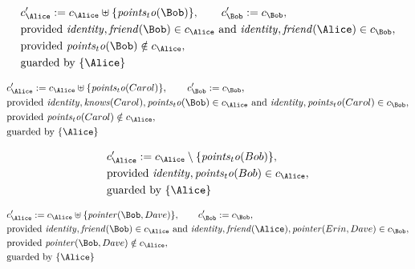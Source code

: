 \begin{align*}
&
c'_
{
\Alice
}
 := 
c_
{
\Alice
}
 \uplus 
\{
\mathit{
points_to
}
(
\Bob
)
\}
, \qquad 
c'_
{
\Bob
}
 := 
c_
{
\Bob
}
,\\
&
\text{provided } 
\mathit{
identity
}
,
\mathit{
friend
}
(
\Bob
)
 \in c_
{
\Alice
}
 \text{ and } 
\mathit{
identity
}
,
\mathit{
friend
}
(
\Alice
)
 \in c_
{
\Bob
}
,\\
&
\text{provided } 
\mathit{
points_to
}
(
\Bob
)
 \notin c_
{
\Alice
}
,\\
&
\text{guarded by } \{
\Alice
\}
\end{align*}

\begin{align*}
&
c'_
{
\Alice
}
 := 
c_
{
\Alice
}
 \uplus 
\{
\mathit{
points_to
}
(
Carol
)
\}
, \qquad 
c'_
{
\Bob
}
 := 
c_
{
\Bob
}
,\\
&
\text{provided } 
\mathit{
identity
}
,
\mathit{
knows
}
(
Carol
)
,
\mathit{
points_to
}
(
\Bob
)
 \in c_
{
\Alice
}
 \text{ and } 
\mathit{
identity
}
,
\mathit{
points_to
}
(
Carol
)
 \in c_
{
\Bob
}
,\\
&
\text{provided } 
\mathit{
points_to
}
(
Carol
)
 \notin c_
{
\Alice
}
,\\
&
\text{guarded by } \{
\Alice
\}
\end{align*}

\begin{align*}
&
c'_
{
\Alice
}
 := 
c_
{
\Alice
}
 \setminus 
\{
\mathit{
points_to
}
(
Bob
)
\}
,\\
&
\text{provided } 
\mathit{
identity
}
,
\mathit{
points_to
}
(
Bob
)
 \in c_
{
\Alice
}
,\\
&
\text{guarded by } \{
\Alice
\}
\end{align*}

\begin{align*}
&
c'_
{
\Alice
}
 := 
c_
{
\Alice
}
 \uplus 
\{
\mathit{
pointer
}
(
\Bob
,
Dave
)
\}
, \qquad 
c'_
{
\Bob
}
 := 
c_
{
\Bob
}
,\\
&
\text{provided } 
\mathit{
identity
}
,
\mathit{
friend
}
(
\Bob
)
 \in c_
{
\Alice
}
 \text{ and } 
\mathit{
identity
}
,
\mathit{
friend
}
(
\Alice
)
,
\mathit{
pointer
}
(
Erin
,
Dave
)
 \in c_
{
\Bob
}
,\\
&
\text{provided } 
\mathit{
pointer
}
(
\Bob
,
Dave
)
 \notin c_
{
\Alice
}
,\\
&
\text{guarded by } \{
\Alice
\}
\end{align*}

